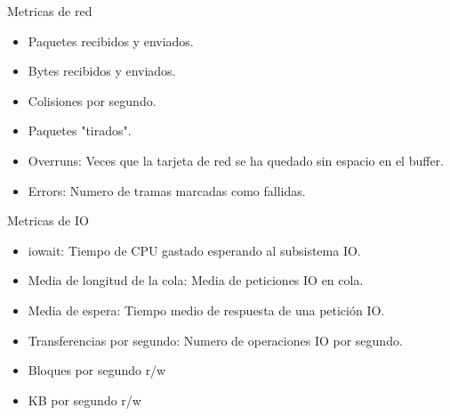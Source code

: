 \begin{frame}{Metricas de red}
	\begin{itemize}
		\item Paquetes recibidos y enviados.
		\item Bytes recibidos y enviados.
		\item Colisiones por segundo.
		\item Paquetes "tirados".
		\item Overruns: Veces que la tarjeta de red se ha quedado sin espacio en el buffer.
		\item Errors: Numero de tramas marcadas como fallidas.
	\end{itemize}
\end{frame}

\begin{frame}{Metricas de IO}
	\begin{itemize}
		\item iowait: Tiempo de CPU gastado esperando al subsistema IO.
		\item Media de longitud de la cola: Media de peticiones IO en cola.
		\item Media de espera: Tiempo medio de respuesta de una petición IO.
		\item Transferencias por segundo: Numero de operaciones IO por segundo.
		\item Bloques por segundo r/w
		\item KB por segundo r/w
	\end{itemize}
\end{frame}

